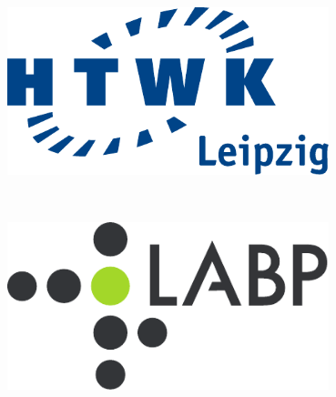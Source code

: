 \begin{titlepage}

\newcommand{\HRule}{\rule{\linewidth}{0.5mm}} %

 

\center

\begin{minipage}{0.48\textwidth}
\begin{flushleft}
\includegraphics[width=0.7\textwidth]{bilder/HTWK_Logo_RGB.pdf}\\
\end{flushleft}
\end{minipage}
~
\begin{minipage}{0.48\textwidth}
\begin{flushright}
\includegraphics[width=0.7\textwidth]{bilder/LaBP-Logokurz.pdf}\\
\end{flushright}
\end{minipage}\\[1.5cm]


\end{titlepage}
